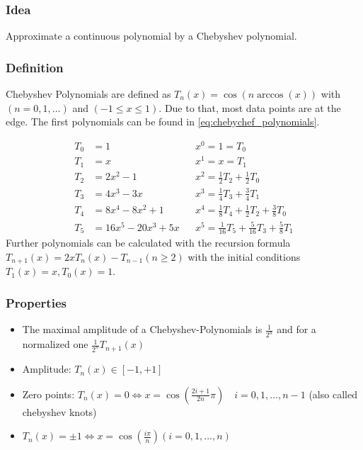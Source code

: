 \subsubsection{Idea}
Approximate a continuous polynomial by a Chebyshev polynomial. 
\subsubsection{Definition}
Chebyshev Polynomials are defined as $T_{n}(x)=\cos (n \arccos (x))$ with $(n=0,1, \ldots)$ and $(-1 \leq x \leq 1)$. Due to that, most data points are at the edge. The first polynomials can be found in \autoref{eq:chebychef_polynomials}.

\begin{equation} \label{eq:chebychef_polynomials}
\begin{aligned}
T_{0} & =1 && x^{0}=1=T_{0} \\
T_{1} & =x && x^{1}=x=T_{1} \\
T_{2} & =2 x^{2}-1 && x^{2}=\frac{1}{2} T_{2}+\frac{1}{2} T_{0} \\
T_{3} & =4 x^{3}-3 x && x^{3}=\frac{1}{4} T_{3}+\frac{3}{4} T_{1} \\
T_{4} & =8 x^{4}-8 x^{2}+1 && x^{4}=\frac{1}{8} T_{4}+\frac{1}{2} T_{2}+\frac{3}{8} T_{0} \\
T_{5} & =16 x^{5}-20 x^{3}+5 x && x^{5}=\frac{1}{16} T_{5}+\frac{5}{16} T_{3}+\frac{5}{8} T_{1}
\end{aligned}
\end{equation}
Further polynomials can be calculated with the recursion formula $T_{n+1}(x)=2 x T_{n}(x)-T_{n-1}(n \geq 2)$ with the initial conditions  $T_{1}(x)=x, T_{0}(x)=1$.
\subsubsection{Properties}
\begin{itemize}
    \item The maximal amplitude of a  Chebyshev-Polynomials is $\frac{1}{2^{n}}$ and for a normalized one $\frac{1}{2^n} T_{n+1}(x)$
    \item Amplitude: $T_{n}(x) \in[-1,+1]$
    \item Zero points: $T_{n}(x)=0 \Leftrightarrow x=\cos \left(\frac{2 i+1}{2 n} \pi\right) \quad i=0,1, \ldots, n-1$ (also called chebyshev knots)
    \item $T_{n}(x)=\pm 1 \Leftrightarrow x=\cos \left(\frac{i \pi}{n}\right)(i=0,1, \ldots, n)$
\end{itemize}



